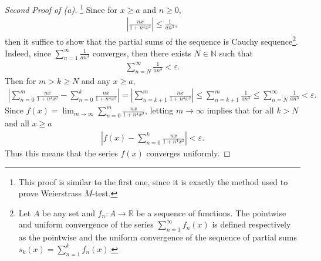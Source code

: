 \documentclass[11pt]{article}
\theoremstyle{definition}
\numberwithin{equation}{subsection}
\begin{document}
\begin{proof}[Second Proof of (a)]\footnote{This proof is similar to the first one, since it is exactly the method used to prove Weierstrass $M$-test.} Since for $x \geq a$ and $n \geq 0$,
\begin{align*}
    \left|\frac{nx}{1 + n^4x^2}\right| \leq \frac{1}{an^3},
\end{align*}
then it suffice to show that the partial sums of the sequence is Cauchy sequence\footnote{Let $A$ be any set and $f_n:A \to \mathbb{R}$ be a sequence of functions. The pointwise and uniform convergence of the series $\displaystyle \sum^\infty_{n=1}f_n(x)$ is defined respectively as the pointwise and the uniform convergence of the sequence of partial sums $s_k(x) = \displaystyle \sum^k_{n=1}f_n(x)$.}. Indeed, since $\displaystyle \sum^\infty_{n=1} \frac{1}{an^3}$ converges, then there exists $N \in \mathbb{N}$ such that 
\begin{align*}
    \sum^\infty_{n=N} \frac{1}{an^3} < \varepsilon.
\end{align*}
Then for $m > k \geq N$ and any $x \geq a$,
\begin{align*}
    \left|\sum^m_{n=0} \frac{nx}{1 + n^4x^2} - \sum^k_{n=0} \frac{nx}{1 + n^4x^2} \right| = \left|\sum^m_{n=k+1} \frac{nx}{1 + n^4x^2}  \right| \leq \sum^m_{n=k+1} \frac{1}{an^3} \leq \sum^\infty_{n=N} \frac{1}{an^3} < \varepsilon.
\end{align*}
Since $\displaystyle f(x) = \lim_{m\to\infty}\sum^m_{n=0} \frac{nx}{1 + n^4x^2}$, letting $m \to \infty$ implies that for all $k > N$ and all $x \geq a$
\begin{align*}
    \left|f(x) - \sum^k_{n=0} \frac{nx}{1 + n^4x^2} \right| < \varepsilon.
\end{align*}
Thus this means that the series $f(x)$ converges uniformly.
\end{proof}

\medskip
\end{document}
